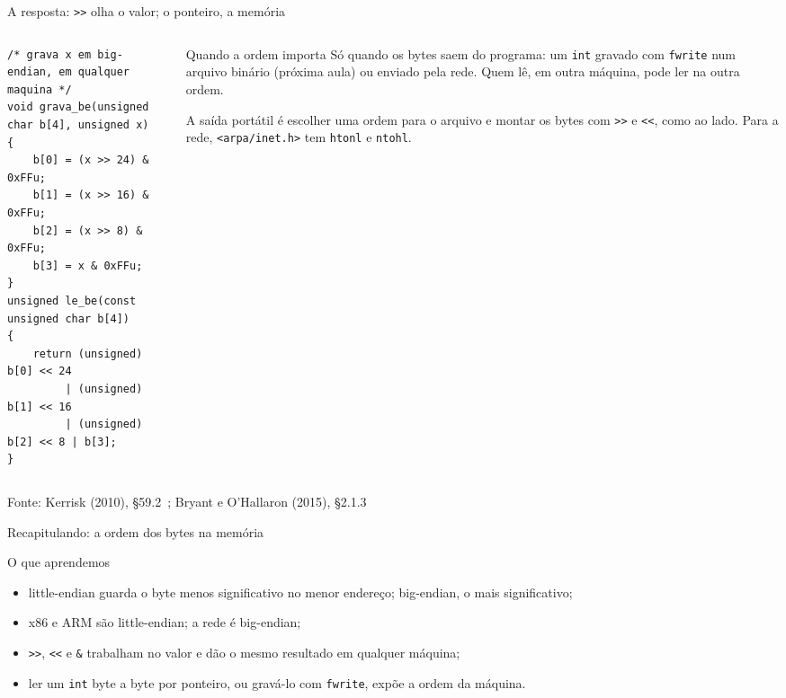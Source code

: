 \documentclass[aspectratio=169]{beamer}
\newcommand{\fonte}[1]{\vfill\hfill{\scriptsize\textcolor{UFSGray}{Fonte: #1}}}
\begin{document}
\begin{frame}[fragile]{A resposta: \texttt{>{}>} olha o valor; o ponteiro, a memória}
  \begin{columns}[T]
    \begin{column}{0.5\textwidth}
\begin{lstlisting}[style=codC]
/* grava x em big-endian, em qualquer maquina */
void grava_be(unsigned char b[4], unsigned x)
{
    b[0] = (x >> 24) & 0xFFu;
    b[1] = (x >> 16) & 0xFFu;
    b[2] = (x >> 8) & 0xFFu;
    b[3] = x & 0xFFu;
}
unsigned le_be(const unsigned char b[4])
{
    return (unsigned) b[0] << 24
         | (unsigned) b[1] << 16
         | (unsigned) b[2] << 8 | b[3];
}
\end{lstlisting}
    \end{column}
    \begin{column}{0.46\textwidth}
      \begin{block}{Quando a ordem importa}
        \small Só quando os bytes saem do programa: um \texttt{int} gravado
        com \texttt{fwrite} num arquivo binário (próxima aula) ou enviado
        pela rede. Quem lê, em outra máquina, pode ler na outra ordem.
      \end{block}
      \small A saída portátil é escolher uma ordem para o arquivo e
      montar os bytes com \texttt{>{}>} e \texttt{<{}<}, como ao lado. Para a
      rede, \texttt{<arpa/inet.h>} tem \texttt{htonl} e \texttt{ntohl}.
    \end{column}
  \end{columns}
  \fonte{Kerrisk (2010), §59.2~\cite{kerrisk2010linux};
    Bryant e O'Hallaron (2015), §2.1.3~\cite{bryant2015computer}}
\end{frame}

\begin{frame}{Recapitulando: a ordem dos bytes na memória}
  \begin{block}{O que aprendemos}
    \begin{itemize}
      \item little-endian guarda o byte menos significativo no menor
        endereço; big-endian, o mais significativo;
      \item x86 e ARM são little-endian; a rede é big-endian;
      \item \texttt{>{}>}, \texttt{<{}<} e \texttt{\&} trabalham no valor e dão
        o mesmo resultado em qualquer máquina;
      \item ler um \texttt{int} byte a byte por ponteiro, ou gravá-lo com
        \texttt{fwrite}, expõe a ordem da máquina.
    \end{itemize}
  \end{block}
\end{frame}
\end{document}
